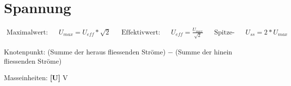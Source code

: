 \section*{Spannung}

\begin{tcolorbox}[colback=white,top=0pt]

    \begin{align*}
        \text{Maximalwert:}                                                                                           &  & U_{max} = U_{eff} * \sqrt{2}       &  &
        \text{Effektivwert:}                                                                                          &  & U_{eff} = \frac{U_{max}}{\sqrt{2}} &  &
        \text{Spitze-Spitze:}                                                                                         &  & U_{ss} = 2 * U_{max}                   
    \end{align*}

    \begin{center}
        Knotenpunkt: (Summe der heraus fliessenden Ströme) $-$ (Summe der hinein fliessenden Ströme)
    \end{center}

    \tcblower
    \begin{center}
        Masseinheiten: \textbf{[U]} V
    \end{center}
\end{tcolorbox}

